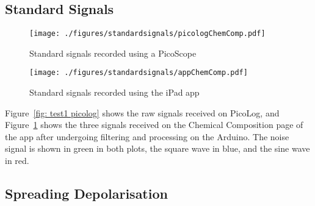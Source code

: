 \subsection{Standard Signals}

\begin{figure}[h!]
\centering
\texttt{[image: ./figures/standardsignals/picologChemComp.pdf]}
\captionsetup{justification=centering}
\caption{Standard signals recorded using a PicoScope}
\label{fig: test1 picolog}
\bigbreak
\texttt{[image: ./figures/standardsignals/appChemComp.pdf]}
\captionsetup{justification=centering}
\caption{Standard signals recorded using the iPad app}
\label{fig: test1 app}
\end{figure}



Figure~\ref{fig: test1 picolog} shows the raw signals received on PicoLog, and Figure~\ref{fig: test1 app} shows the three signals received on the Chemical Composition page of the app after undergoing filtering and processing on the Arduino. The noise signal is shown in green in both plots, the square wave in blue, and the sine wave in red.


\subsection{Spreading Depolarisation}